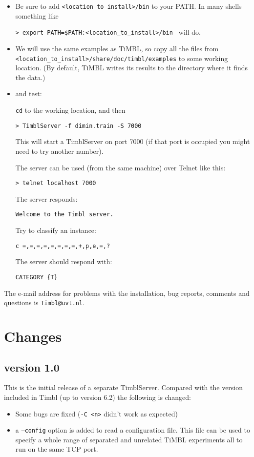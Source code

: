 \documentclass{report}
\begin{document}
\begin{itemize}
\item Be sure to add {\tt <location\_to\_install>/bin} to your PATH. 
In many shells something like

 {\tt > export PATH=\$PATH:<location\_to\_install>/bin }
will do.
\item We will use the same examples as TiMBL, so copy all the files from {\tt
  <location\_to\_install>/share/doc/timbl/examples} to some working
location. (By default, TiMBL writes its results to the directory where
it finds the data.)
\item and test:

{\tt cd} to the working location, and then

{\tt > TimblServer -f dimin.train -S 7000}

This will start a TimblServer on port 7000 (if that port is occupied you might need to try another number).

The server can be used (from the same machine) over Telnet like this:

{\tt > telnet localhost 7000 }

The server responds:

{\tt Welcome to the Timbl server.}

Try to classify an instance:

{\tt c =,=,=,=,=,=,=,=,+,p,e,=,? }

The server should respond with:

{\tt CATEGORY \{T\} }

\end{itemize}

The e-mail address for problems with the installation, bug reports, comments and questions is {\tt Timbl@uvt.nl}.

\chapter{Changes}
\label{changes}

\section{version 1.0}

This is the initial release of a separate TimblServer.
Compared with the version included in Timbl (up to version 6.2) the following is changed:

\begin{itemize}

\item Some bugs are fixed ({\tt -C <n>} didn't work as expected)
\item a {\tt --config} option is added to read a configuration file. This
  file can be used to specify a whole range of separated and unrelated
  TiMBL experiments all to run on the same TCP port.

\end{itemize}
\end{document}
